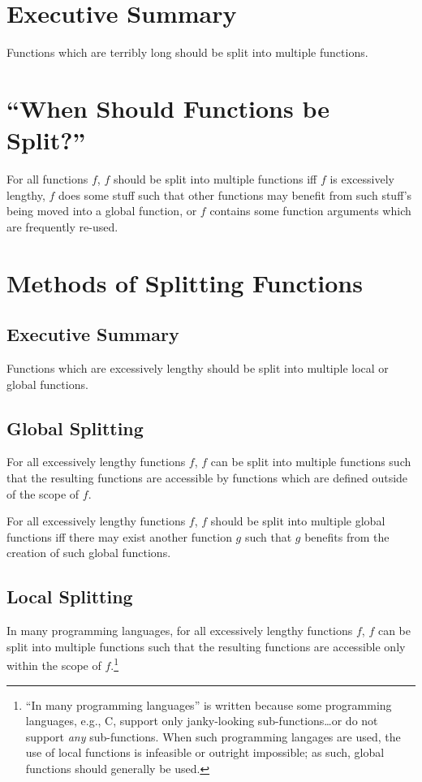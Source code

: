 \documentclass{report}
\begin{document}
\section{Executive Summary}
Functions which are terribly long should be split into multiple functions.
\section{``When Should Functions be Split?''}
For all functions $f$, $f$ should be split into multiple functions iff $f$ is excessively lengthy, $f$ does some stuff such that other functions may benefit from such stuff's being moved into a global function, or $f$ contains some function arguments which are frequently re-used.
\section{Methods of Splitting Functions}
\subsection{Executive Summary}
Functions which are excessively lengthy should be split into multiple local or global functions.
\subsection{Global Splitting}
For all excessively lengthy functions $f$, $f$ can be split into multiple functions such that the resulting functions are accessible by functions which are defined outside of the scope of $f$.

For all excessively lengthy functions $f$, $f$ should be split into multiple global functions iff there may exist another function $g$ such that $g$ benefits from the creation of such global functions.
\subsection{Local Splitting}
In many programming languages, for all excessively lengthy functions $f$, $f$ can be split into multiple functions such that the resulting functions are accessible only within the scope of $f$.\footnote{``In many programming languages'' is written because some programming languages, e.g., C, support only janky-looking sub-functions\ldots or do not support \textit{any} sub-functions.  When such programming langages are used, the use of local functions is infeasible or outright impossible; as such, global functions should generally be used.}
\end{document}
